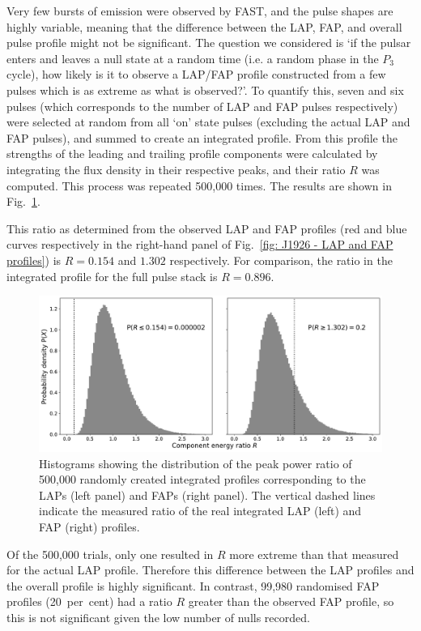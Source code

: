 Very few bursts of emission were observed by FAST, and the pulse shapes are highly variable, meaning that the difference between the LAP, FAP, and overall pulse profile might not be significant. The question we considered is `if the pulsar enters and leaves a null state at a random time (i.e. a random phase in the $P_3$ cycle), how likely is it to observe a LAP/FAP profile constructed from a few pulses which is as extreme as what is observed?'.
To quantify this, seven and six pulses (which corresponds to the number of LAP and FAP pulses respectively) were selected at random from all `on' state pulses (excluding the actual LAP and FAP pulses), and summed to create an integrated profile. From this profile the strengths of the leading and trailing profile components were calculated by integrating the flux density in their respective peaks, and their ratio $R$ was computed. This process was repeated 500,000 times. The results are shown in Fig.~\ref{fig: J1926 - LAP and FAP histograms}.


This ratio as determined from the observed LAP and FAP profiles (red and blue curves respectively in the right-hand panel of Fig.~\ref{fig: J1926 - LAP and FAP profiles}) is $R=0.154$ and $1.302$ respectively.  For comparison, the ratio in the integrated profile for the full pulse stack is $R = 0.896$.
\begin{figure}
    \begin{center}
        \includegraphics[width=1.0\textwidth]{Figures/J1926/LAPFAP_histograms}
        \caption[Calculating the significance of the LAP and FAP profiles]{Histograms showing the distribution of the peak power ratio of 500,000 randomly created integrated profiles corresponding to the LAPs (left panel) and FAPs (right panel). The vertical dashed lines indicate the measured ratio of the real integrated LAP (left) and FAP (right) profiles.}
        \label{fig: J1926 - LAP and FAP histograms}
    \end{center}
\end{figure}
Of the 500,000 trials, only one resulted in $R$ more extreme than that measured for the actual LAP profile. Therefore this difference between the LAP profiles and the overall profile is highly significant. In contrast, 99,980 randomised FAP profiles (20~per~cent) had a ratio $R$ greater than the observed FAP profile, so this is not significant given the low number of nulls recorded.


